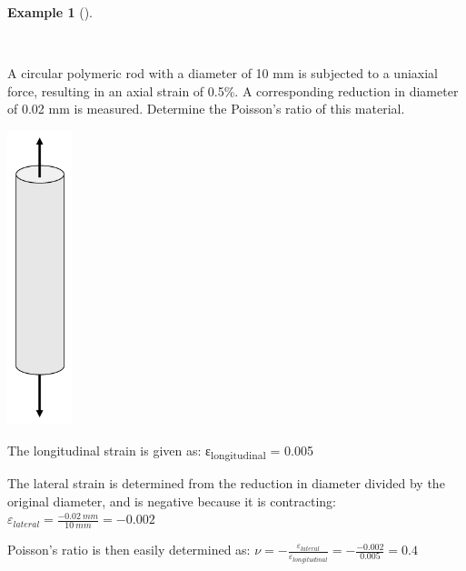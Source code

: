 \documentclass[
  letterpaper,
  DIV=11,
  numbers=noendperiod]{scrreprt}
\theoremstyle{definition}
\newtheorem{example}{Example}[chapter]
\theoremstyle{remark}
\begin{document}
\begin{tcolorbox}[enhanced jigsaw, left=2mm, toptitle=1mm, breakable, coltitle=black, colbacktitle=quarto-callout-tip-color!10!white, opacitybacktitle=0.6, bottomrule=.15mm, titlerule=0mm, leftrule=.75mm, colframe=quarto-callout-tip-color-frame, bottomtitle=1mm, opacityback=0, title={Example 4.2}, arc=.35mm, colback=white, rightrule=.15mm, toprule=.15mm]

\begin{example}[]\protect\hypertarget{exm-4.2}{}\label{exm-4.2}

~

A circular polymeric rod with a diameter of 10 mm is subjected to a
uniaxial force, resulting in an axial strain of 0.5\%. A corresponding
reduction in diameter of 0.02 mm is measured. Determine the Poisson's
ratio of this material.

\begin{tcolorbox}[enhanced jigsaw, left=2mm, toptitle=1mm, breakable, coltitle=black, colbacktitle=quarto-callout-tip-color!10!white, opacitybacktitle=0.6, bottomrule=.15mm, titlerule=0mm, leftrule=.75mm, colframe=quarto-callout-tip-color-frame, bottomtitle=1mm, opacityback=0, title={Solution}, arc=.35mm, colback=white, rightrule=.15mm, toprule=.15mm]

\begin{center}
\includegraphics[width=0.75in,height=\textheight]{images/CH4 PNGs/example 4.2.png}
\end{center}

The longitudinal strain is given as: ε\textsubscript{longitudinal} =
0.005

The lateral strain is determined from the reduction in diameter divided
by the original diameter, and is negative because it is contracting:
\(\varepsilon_{lateral}=\frac{-0.02{~mm}}{10{~mm}}=-0.002\)

Poisson's ratio is then easily determined as:
\(\nu=-\frac{\varepsilon_{lateral}}{\varepsilon_{longitudinal}}=-\frac{-0.002}{0.005}=0.4\)

\end{tcolorbox}

\end{example}

\end{tcolorbox}
\end{document}
